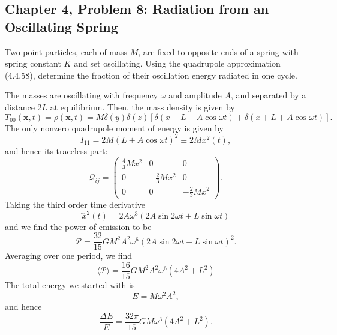 \subsection{Chapter 4, Problem 8: Radiation from an Oscillating Spring}

Two point particles, each of mass $M$, are fixed to opposite ends of a spring with
spring constant $K$ and set oscillating. Using the quadrupole approximation
(4.4.58), determine the fraction of their oscillation energy radiated in one cycle.
\begin{solution}
    The masses are oscillating with frequency $\omega$ and amplitude $A$, and separated by a distance $2L$ at equilibrium. Then, the mass density is given by
    \begin{equation}
        T_{00}(\mathbf{x},t) = \rho(\mathbf{x},t) = M\delta(y)\delta(z)[\delta(x-L-A\cos\omega t) + \delta(x+L +A\cos\omega t)].
    \end{equation}
    The only nonzero quadrupole moment of energy is given by
    \begin{equation}
        I_{11} = 2M (L+A\cos\omega t)^2 \equiv 2M x^2(t),
    \end{equation}
    and hence its traceless part:
    \begin{equation}
        \mathcal{Q}_{ij} = \begin{pmatrix}
            \frac{4}{3}Mx^2 & 0 &0\\
            0& -\frac{2}{3}Mx^2 &0\\
            0 & 0 & -\frac23 Mx^2
        \end{pmatrix}.
    \end{equation}
    Taking the third order time derivative
    \begin{equation}
        \dddot{x}^2(t) =2A\omega^3(2A\sin 2\omega t + L\sin \omega t)
    \end{equation}
    and we find the power of emission to be
    \begin{equation}
        \mathcal{P} = \frac{32}{15}GM^2A^2\omega^6(2A\sin 2\omega t + L\sin \omega t)^2.
    \end{equation}
    Averaging over one period, we find
    \begin{equation}
        \langle\mathcal{P}\rangle = \frac{16}{15}GM^2A^2\omega^6(4A^2 + L^2)
    \end{equation}
    The total energy we started with is
    \begin{equation}
        E = M\omega^2A^2,
    \end{equation}
    and hence
    \begin{equation}
        \frac{\Delta E}{E} = \frac{32\pi}{15}GM\omega^3(4A^2 + L^2).
    \end{equation}
\end{solution}

